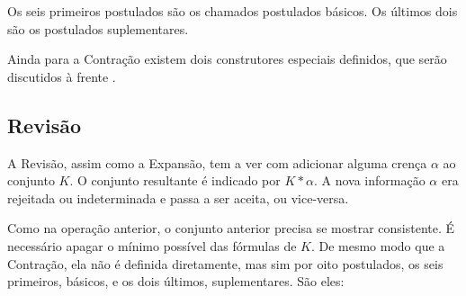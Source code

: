 Os seis primeiros postulados são os chamados postulados básicos. Os últimos dois são os postulados suplementares.

Ainda para a Contração existem dois construtores especiais definidos, que serão discutidos à frente \citep{logicaMatos}.

\subsection{Revisão}

A Revisão, assim como a Expansão, tem a ver com adicionar alguma crença $ \alpha $ ao conjunto $ K $. O conjunto resultante é indicado por $ K \ast \alpha $. A nova informação $ \alpha $ era rejeitada ou indeterminada e passa a ser aceita, ou vice-versa.

Como na operação anterior, o conjunto anterior precisa se mostrar consistente. É necessário apagar o mínimo possível das fórmulas de $ K $. De mesmo modo que a Contração, ela não é definida diretamente, mas sim por oito postulados, os seis primeiros, básicos, e os dois últimos, suplementares. São eles:

